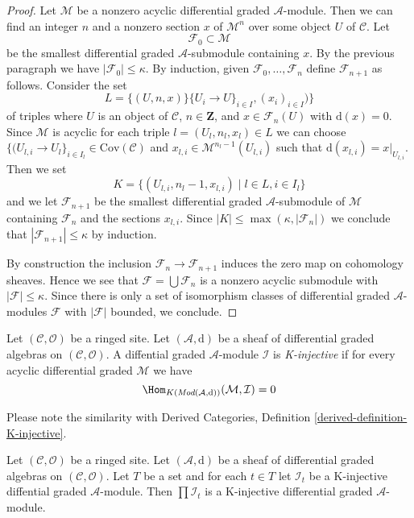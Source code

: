 \begin{proof}
\medskip\noindent
Let $\mathcal{M}$ be a nonzero acyclic differential graded
$\mathcal{A}$-module. Then we can find an integer $n$ and a
nonzero section $x$ of $\mathcal{M}^n$ over some object $U$
of $\mathcal{C}$. Let
$$
\mathcal{F}_0 \subset \mathcal{M}
$$
be the smallest differential graded $\mathcal{A}$-submodule
containing $x$. By the previous paragraph we have
$|\mathcal{F}_0| \leq \kappa$. By induction, given
$\mathcal{F}_0, \ldots, \mathcal{F}_n$ define
$\mathcal{F}_{n + 1}$ as follows. Consider the set
$$
L = \{(U, n, x)\}
\{U_i \to U\}_{i \in I}, (x_i)_{i \in I})\}
$$
of triples where $U$ is an object of $\mathcal{C}$, $n \in \mathbf{Z}$,
and $x \in \mathcal{F}_n(U)$ with $\text{d}(x) = 0$. Since
$\mathcal{M}$ is acyclic for each triple $l = (U_l, n_l, x_l) \in L$
we can choose
$\{(U_{l, i} \to U_l\}_{i \in I_l} \in \text{Cov}(\mathcal{C})$ and
$x_{l, i} \in \mathcal{M}^{n_l - 1}(U_{l, i})$ such that
$\text{d}(x_{l, i}) = x|_{U_{l, i}}$. Then we set
$$
K = \{(U_{l, i}, n_l - 1, x_{l, i}) \mid l \in L, i \in I_l\}
$$
and we let $\mathcal{F}_{n + 1}$ be the smallest differential
graded $\mathcal{A}$-submodule of $\mathcal{M}$ containing
$\mathcal{F}_n$ and the sections $x_{l, i}$.
Since $|K| \leq \max(\kappa, |\mathcal{F}_n|)$
we conclude that $|\mathcal{F}_{n + 1}| \leq \kappa$ by induction.

\medskip\noindent
By construction the inclusion $\mathcal{F}_n \to \mathcal{F}_{n + 1}$
induces the zero map on cohomology sheaves. Hence we see that
$\mathcal{F} = \bigcup \mathcal{F}_n$ is a nonzero acyclic submodule
with $|\mathcal{F}| \leq \kappa$. Since there is only a set
of isomorphism classes of differential graded $\mathcal{A}$-modules
$\mathcal{F}$ with $|\mathcal{F}|$ bounded, we conclude.
\end{proof}

\begin{definition}
\label{definition-K-injective}
Let $(\mathcal{C}, \mathcal{O})$ be a ringed site.
Let $(\mathcal{A}, \text{d})$ be a sheaf of differential graded algebras
on $(\mathcal{C}, \mathcal{O})$. A diffential graded $\mathcal{A}$-module
$\mathcal{I}$ is {\it K-injective} if for every acyclic
differential graded $\mathcal{M}$ we have 
$$
\Hom_{K(\textit{Mod}(\mathcal{A}, \text{d}))}(\mathcal{M}, \mathcal{I}) = 0
$$
\end{definition}

\noindent
Please note the similarity with
Derived Categories, Definition \ref{derived-definition-K-injective}.

\begin{lemma}
\label{lemma-product-K-injective}
Let $(\mathcal{C}, \mathcal{O})$ be a ringed site.
Let $(\mathcal{A}, \text{d})$ be a sheaf of differential graded algebras
on $(\mathcal{C}, \mathcal{O})$. Let $T$ be a set and for
each $t \in T$ let $\mathcal{I}_t$ be a K-injective
diffential graded $\mathcal{A}$-module. Then
$\prod \mathcal{I}_t$ is a K-injective differential
graded $\mathcal{A}$-module.
\end{lemma}

